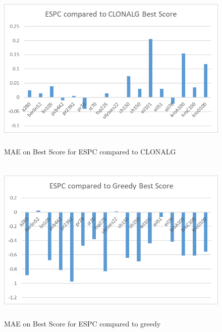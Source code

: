 \begin{figure}[H]
	\includegraphics[height=8cm,width=13cm]{Images/ESPC_Fig_Best2.png}
	\caption{MAE on Best Score for ESPC compared to CLONALG}
	\label{ESCP_Best}
\end{figure}
\begin{figure}[H]
	\includegraphics[height=8cm,width=13cm]{Images/ESPC_Fig_Greedy2.png}
	\caption{MAE on Best Score for ESPC compared to greedy}
	\label{ESCP_greedy}
\end{figure}
